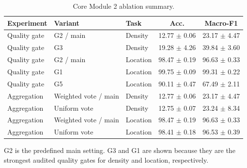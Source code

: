 \begin{table}[htbp]
\centering
\small
\caption{Core Module 2 ablation summary.}
\label{tab:module2-core-ablation}
\begin{tabular}{lllcc}
\hline
Experiment & Variant & Task & Acc. & Macro-F1 \\
\hline
Quality gate & G2 / main & Density & 12.77 $\pm$ 0.06 & 23.17 $\pm$ 4.47 \\
Quality gate & G3 & Density & 19.28 $\pm$ 4.26 & 39.84 $\pm$ 3.60 \\
Quality gate & G2 / main & Location & 98.47 $\pm$ 0.19 & 96.63 $\pm$ 0.33 \\
Quality gate & G1 & Location & 99.75 $\pm$ 0.09 & 99.31 $\pm$ 0.22 \\
Quality gate & G5 & Location & 90.11 $\pm$ 0.47 & 67.49 $\pm$ 2.11 \\
Aggregation & Weighted vote / main & Density & 12.77 $\pm$ 0.06 & 23.17 $\pm$ 4.47 \\
Aggregation & Uniform vote & Density & 12.75 $\pm$ 0.07 & 23.24 $\pm$ 8.34 \\
Aggregation & Weighted vote / main & Location & 98.47 $\pm$ 0.19 & 96.63 $\pm$ 0.33 \\
Aggregation & Uniform vote & Location & 98.41 $\pm$ 0.18 & 96.53 $\pm$ 0.39 \\
\hline
\end{tabular}
\vspace{0.4em}
\parbox{0.96\linewidth}{\footnotesize
G2 is the predefined main setting. G3 and G1 are shown because they are the strongest audited quality gates for density and location, respectively.}
\end{table}
